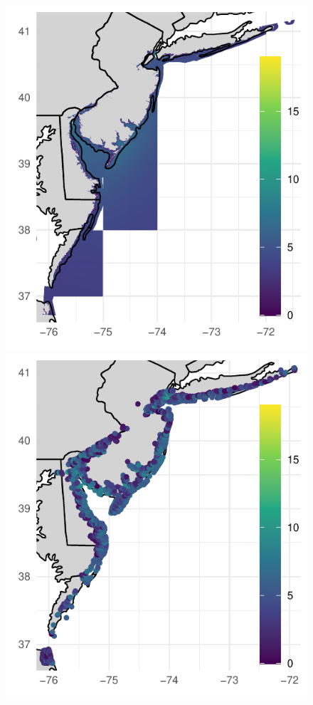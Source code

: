 \begin{figure}[ht]
    \centering
    \begin{minipage}{0.45\textwidth}
    \centering
    \includegraphics[width=0.99\linewidth]{./plots/slosh1run}
    \end{minipage}%
    \begin{minipage}{0.45\textwidth}
    \centering
    \includegraphics[width=0.99\linewidth]{./plots/sloshthreshold}

\end{minipage}
\end{figure}
